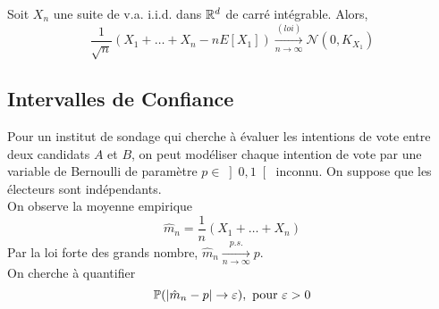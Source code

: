 \documentclass{cours}
\begin{document}
\begin{theorem}
    Soit $X_{n}$ une suite de v.a. i.i.d. dans $\mathbb{R}^{d}$ de carré intégrable. Alors,
    \[
        \frac{1}{\sqrt{n}}\left(X_{1} + \ldots + X_{n} - nE[X_{1}]\right)\xrightarrow[n \to \infty]{(loi)}\mathcal{N}(0, K_{X_{1}})
    \]
\end{theorem}

\subsection{Intervalles de Confiance}
Pour un institut de sondage qui cherche à évaluer les intentions de vote entre deux candidats $A$ et $B$, on peut modéliser chaque intention de vote par une variable de Bernoulli de paramètre $p \in \left]0, 1 \right[$ inconnu. On suppose que les électeurs sont indépendants. \\
On observe la moyenne empirique
\[
    \hat{m}_{n} = \frac{1}{n}\left(X_{1} + \ldots + X_{n}\right)
\]
Par la loi forte des grands nombre, $\hat{m}_{n} \xrightarrow[n \to \infty]{p.s.} p$.\\
On cherche à quantifier
\[
    \mathbb{P}(\left|\hat{m}_{n} - p\right| \to \varepsilon), \text{ pour } \varepsilon > 0
\]
\end{document}
